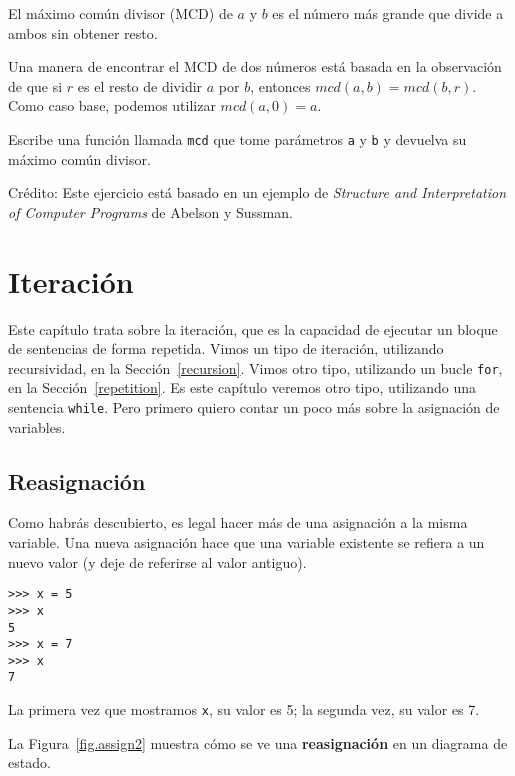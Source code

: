 \documentclass[10pt]{book}
\begin{document}
\begin{exercise}

El máximo común divisor (MCD) de $a$ y $b$ es el número más grande
que divide a ambos sin obtener resto.

Una manera de encontrar el MCD de dos números está basada en la observación
de que si $r$ es el resto de dividir $a$ por $b$, entonces $mcd(a,
b) = mcd(b, r)$.  Como caso base, podemos utilizar $mcd(a, 0) = a$.

Escribe una función llamada
\verb"mcd" que tome parámetros {\tt a} y {\tt b}
y devuelva su máximo común divisor.

Crédito: Este ejercicio está basado en un ejemplo de
{\em Structure and Interpretation of Computer Programs} de Abelson y Sussman.

\end{exercise}


\chapter{Iteración}

Este capítulo trata sobre la iteración, que es la capacidad de ejecutar
un bloque de sentencias de forma repetida.  Vimos un tipo de iteración,
utilizando recursividad, en la Sección~\ref{recursion}.
Vimos otro tipo, utilizando un bucle {\tt for},
en la Sección~\ref{repetition}.  Es este capítulo veremos otro
tipo, utilizando una sentencia {\tt while}.
Pero primero quiero contar un poco más sobre la asignación de variables.


\section{Reasignación}

Como habrás descubierto, es legal hacer más de una
asignación a la misma variable.  Una nueva asignación hace que una variable existente
se refiera a un nuevo valor (y deje de referirse al valor antiguo).

\begin{verbatim}
>>> x = 5
>>> x
5
>>> x = 7
>>> x
7
\end{verbatim}
%
La primera vez que mostramos
{\tt x}, su valor es 5; la segunda vez, su
valor es 7.

La Figura~\ref{fig.assign2} muestra cómo se ve una {\bf reasignación}
en un diagrama de estado.  
\end{document}
